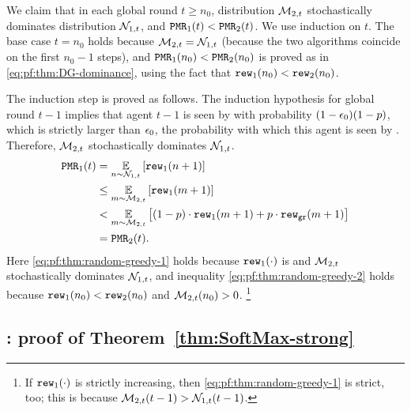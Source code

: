 We claim that in each global round $t\geq n_0$, distribution $\mathcal{M}_{2,t}$ stochastically dominates distribution $\mathcal{N}_{1,t}$, and $\mathtt{PMR}_1(t)<\mathtt{PMR}_2(t)$. We use induction on $t$. The base case $t=n_0$ holds because $\mathcal{M}_{2,t} = \mathcal{N}_{1,t}$ (because the two algorithms coincide on the first $n_0-1$ steps), and $\mathtt{PMR}_1(n_0)<\mathtt{PMR}_2(n_0)$ is proved as in \eqref{eq:pf:thm:DG-dominance}, using the fact that $\mathtt{rew}_1(n_0)<\mathtt{rew}_2(n_0)$.

The induction step is proved as follows. The induction hypothesis for global round $t-1$ implies that agent $t-1$ is seen by \alg with probability $(1-\epsilon_0)(1-p)$, which is strictly larger than $\epsilon_0$, the probability with which this agent is seen by \alg[2]. Therefore, $\mathcal{M}_{2,t}$ stochastically dominates $\mathcal{N}_{1,t}$.
\begin{align}
\mathtt{PMR}_1(t)
  &= \operatorname*{\mathbb{E}}_{n\sim \mathcal{N}_{1,t}}\left[\mathtt{rew}_1(n+1)\right] \nonumber \\
  &\leq \operatorname*{\mathbb{E}}_{m\sim \mathcal{M}_{2,t}}\left[\mathtt{rew}_1(m+1)\right]
    \label{eq:pf:thm:random-greedy-1}\\
  &< \operatorname*{\mathbb{E}}_{m\sim \mathcal{M}_{2,t}}\left[(1-p)\cdot \mathtt{rew}_1(m+1) + p\cdot \mathtt{rew}_{\texttt{gr}}(m+1)\right]
    \label{eq:pf:thm:random-greedy-2} \\
  &= \mathtt{PMR}_2(t). \nonumber
\end{align}
Here \eqref{eq:pf:thm:random-greedy-1} holds because $\mathtt{rew}_1(\cdot)$ is \bmonotone and $\mathcal{M}_{2,t}$ stochastically dominates $\mathcal{N}_{1,t}$, and inequality \eqref{eq:pf:thm:random-greedy-2} holds because $\mathtt{rew}_1(n_0)<\mathtt{rew}_2(n_0)$ and $\mathcal{M}_{2,t}(n_0)>0$.%
\footnote{If $\mathtt{rew}_1(\cdot)$ is strictly increasing, then  \eqref{eq:pf:thm:random-greedy-1} is strict, too; this is because $\mathcal{M}_{2,t}(t-1)>\mathcal{N}_{1,t}(t-1)$.  }



\subsection{\SoftMaxRandom: proof of Theorem~\ref{thm:SoftMax-strong}}
\label{sec:proofs-SoftMax}

